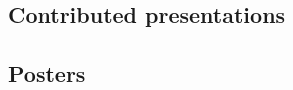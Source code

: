 \documentclass[11pt,letterpaper,sans,unicode]{moderncv}
\begin{document}
\subsection{Contributed presentations} %

\renewcommand\labelenumi{\bfseries\theenumi .}
\begin{etaremune}[leftmargin=8mm]
\small

\end{etaremune}

\subsection{Posters}
\begin{etaremune}[leftmargin=8mm]
\small

\end{etaremune}
\end{document}
